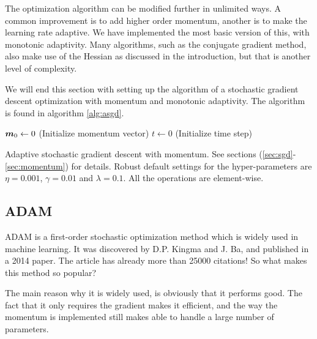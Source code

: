 The optimization algorithm can be modified further in unlimited ways. A common improvement is to add higher order momentum, another is to make the learning rate adaptive. We have implemented the most basic version of this, with monotonic adaptivity. Many algorithms, such as the conjugate gradient method, also make use of the Hessian as discussed in the introduction, but that is another level of complexity. 

We will end this section with setting up the algorithm of a stochastic gradient descent optimization with momentum and monotonic adaptivity. The algorithm is found in algorithm \eqref{alg:asgd}.

\IncMargin{1em}
\begin{algorithm}
	\SetAlgoLined
	
	$\boldsymbol{{m}}_0\leftarrow 0$ (Initialize momentum vector)\;
	$t\leftarrow 0$ (Initialize time step)\;
	\caption{Adaptive stochastic gradient descent with momentum. See sections (\ref{sec:sgd}-\ref{sec:momentum}) for details. Robust default settings for the hyper-parameters are $\eta=0.001$, $\gamma=0.01$ and $\lambda=0.1$. All the operations are element-wise.}
	\label{alg:asgd}
\end{algorithm}\DecMargin{1em}

\subsection{ADAM} \label{sec:adam}
ADAM is a first-order stochastic optimization method which is widely used in machine learning. It was discovered by D.P. Kingma and J. Ba, and published in a 2014 paper. The article has already more than 25000 citations! \cite{kingma_adam:_2014} So what makes this method so popular? 

The main reason why it is widely used, is obviously that it performs good. The fact that it only requires the gradient makes it efficient, and the way the momentum is implemented still makes able to handle a large number of parameters. 

